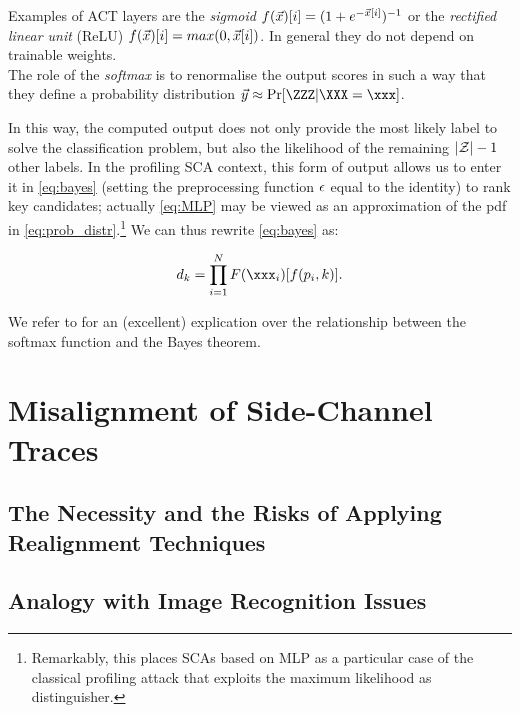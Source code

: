  Examples of ACT layers are the {\em sigmoid} $f(\vec{x})[i] = (1+e^{-\vec{x}[i]})^{-1}$ or the {\em rectified linear unit} (ReLU) $f(\vec{x})[i] = max(0,\vec{x}[i])$. In general they do not depend on trainable weights.\\
 
The role of the \emph{softmax} is to renormalise the output scores in such a way that they define a probability distribution $\yyy \approx \mathrm{Pr}[\ZZZ | \XXX = \xxx]$.

In this way, the computed output does not only provide the most likely label to solve the classification problem, but also the likelihood of the remaining $|\mathcal{Z}|-1$ other labels. In the profiling SCA context, this form of output allows us to enter it in \eqref{eq:bayes} (setting the preprocessing function $\epsilon$ equal to the identity) to rank key candidates; actually \eqref{eq:MLP} may be viewed as an approximation of the pdf in \eqref{eq:prob_distr}.\footnote{Remarkably, this places SCAs based on MLP as a particular case of the classical profiling attack that exploits the maximum likelihood as distinguisher.}  We can thus rewrite \eqref{eq:bayes} as:

\begin{equation}\label{eq:NN_SCA}
d_k = \prod_{i=1}^{N} F(\xxx_i)[f(p_i,k)].
\end{equation}

We refer to \cite{lin2016does} for an (excellent) explication over the relationship between the softmax function and the Bayes theorem.





\section{Misalignment of Side-Channel Traces}

\subsection{The Necessity and the Risks of Applying Realignment Techniques}
\subsection{Analogy with Image Recognition Issues}

